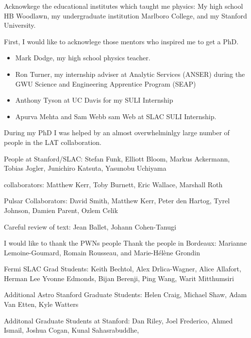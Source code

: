 

Acknowkege the educational institutes which taught me physics: My high school HB Woodlawn,
my undergraduate institution Marlboro College, and my Stanford University.

First, I would like to acknowlege those mentors who inspired me to get a PhD.
\begin{itemize}
  \item Mark Dodge, my high school physics teacher.
  \item Ron Turner, my internship adviser at Analytic Services (ANSER) during the 
  GWU Science and Engineering Apprentice Program (SEAP)
  \item Anthony Tyson at UC Davis for my SULI Internship
  \item Apurva Mehta and Sam Webb sam Web at SLAC SULI Internship.
\end{itemize}


During my PhD I was helped by an almost overwhelminlgy large 
number of people in the \ac{LAT} collaboration.

People at Stanford/SLAC: Stefan Funk, Elliott Bloom, 
Markus Ackermann, Tobias Jogler, Junichiro Katsuta, Yasunobu Uchiyama

\pointlike collaborators: Matthew Kerr, Toby Burnett, Eric Wallace, Marshall Roth

Pulsar Collaborators: David Smith, Matthew Kerr, Peter den Hartog, Tyrel Johnson, Damien Parent, Ozlem Celik

Careful review of text: Jean Ballet, Johann Cohen-Tanugi

I would like to thank the \acp{PWN} people
Thank the people in Bordeaux: Marianne Lemoine-Goumard, Romain Rousseau, and Marie-H\'el\`ene Grondin


Fermi SLAC Grad Students: Keith Bechtol, Alex Drlica-Wagner, Alice Allafort, Herman Lee
Yvonne Edmonds, Bijan Berenji, Ping Wang, Warit Mitthumsiri


Additional Astro Stanford Graduate Students: Helen Craig, Michael Shaw, Adam Van Etten, Kyle Watters

Additonal Graduate Students at Stanford: Dan Riley, Joel Frederico, Ahmed Ismail, Joshua Cogan, Kunal Sahasrabuddhe,

